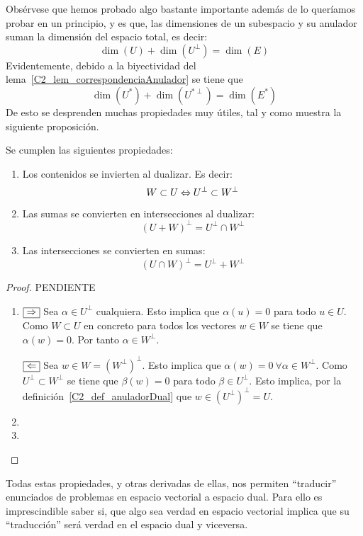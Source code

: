 Obsérvese que hemos probado algo bastante importante además de lo queríamos probar en un principio, y es que, las dimensiones de un subespacio y su anulador suman la dimensión del espacio total, es decir:
\begin{equation}
\dim(U)+\dim(U^{\perp})=\dim(E)
\end{equation}
Evidentemente, debido a la biyectividad del lema~\ref{C2_lem_correspondenciaAnulador} se tiene que
\begin{equation*}
\dim(U^*)+\dim(U^{*\perp})=\dim(E^*)
\end{equation*}
De esto se desprenden muchas propiedades muy útiles, tal y como muestra la siguiente proposición.
\begin{prop}
	\label{C2_lem_propiedadespasodual}
	Se cumplen las siguientes propiedades:
	\begin{enumerate}
		\item Los contenidos se invierten al dualizar. Es decir: \[W\subset U\Leftrightarrow U^{\perp}\subset W^{\perp}\]
		\item Las sumas se convierten en intersecciones al dualizar:
		\[(U+W)^{\perp}=U^{\perp}\cap W^{\perp}\]
		\item Las intersecciones se convierten en sumas:
		\[(U\cap W)^{\perp}=U^{\perp}+ W^{\perp}\]
	\end{enumerate}
\end{prop}
\begin{proof} PENDIENTE
	\begin{enumerate}
		\item $\fbox{$\Rightarrow$}$ Sea $\alpha\in U^{\perp}$ cualquiera. Esto implica que $\alpha(u)=0$ para todo $u\in U$. Como $W\subset U$ en concreto para todos los vectores $w\in W$ se tiene que $\alpha(w)=0$. Por tanto $\alpha\in W^{\perp}$.
		
		$\fbox{$\Leftarrow$}$ Sea $w\in W=(W^{\perp})^{\perp}$. Esto implica que $\alpha(w)=0 \ \forall \alpha \in W^{\perp}$. Como $U^{\perp}\subset W^{\perp}$ se tiene que $\beta (w)=0$ para todo $\beta\in U^{\perp}$. Esto implica, por la definición~\ref{C2_def_anuladorDual} que $w\in (U^{\perp})^{\perp}=U$.
		
		
		\item 
		\item
	\end{enumerate}
\end{proof}
Todas estas propiedades, y otras derivadas de ellas, nos permiten ``traducir'' enunciados de problemas en espacio vectorial a espacio dual. Para ello es imprescindible saber si, que algo sea verdad en espacio vectorial implica que su ``traducción'' será verdad en el espacio dual y viceversa.

